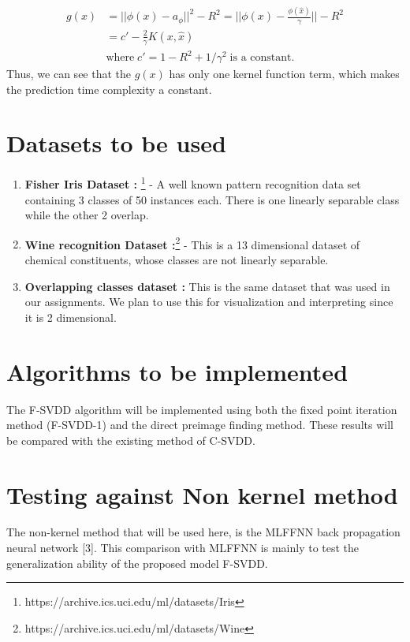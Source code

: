 \documentclass{article} %
\begin{document}
\begin{equation}
\begin{split}
g(x) &= || \phi(x) - a_\phi||^2 - R^2 = ||\phi(x) - \frac{\phi(\hat{x})}{\gamma} || - R^2 \\
 &=   c' - \frac{2}{\gamma} K(x,\hat{x}) \\
 & \text{where}\;  c' = 1- R^2 + 1/\gamma^2 \; \text{is a constant}.
\end{split}
\end{equation}
Thus, we can see that the $g(x)$ has only one kernel function term, which makes the prediction time complexity a constant.

\section{Datasets to be used}

\begin{enumerate}
\item \textbf{Fisher Iris Dataset :} \footnote{https://archive.ics.uci.edu/ml/datasets/Iris} - A well known pattern recognition data set containing 3 classes of 50 instances each. There is one linearly separable class while the other 2 overlap.

\item \textbf{Wine recognition Dataset :}\footnote{https://archive.ics.uci.edu/ml/datasets/Wine}  - This is a 13 dimensional dataset of chemical constituents, whose classes are not linearly separable. 

\item \textbf{Overlapping classes dataset :} This is the same dataset that was used in our assignments. We plan to use this for visualization and interpreting since it is 2 dimensional.
\end{enumerate}


\section{Algorithms to be implemented}

The F-SVDD algorithm will be implemented using both the fixed point iteration method (F-SVDD-1) and the direct preimage finding method. These results will be compared with the existing method of C-SVDD. 
\section{Testing against Non kernel method}
The non-kernel method that will be used here, is the MLFFNN back propagation neural network [3]. This comparison with MLFFNN is mainly to test the generalization ability of the proposed model F-SVDD.
\end{document}
